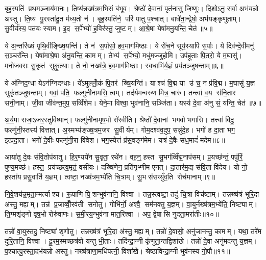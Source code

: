 बृह॒स्पति॑ प्रथ॒मञ्जाय॑मानः। ति॒ष्य॑न्नख्ष॑त्रम॒भिसं ब॑भूव। श्रेष्ठो॑ दे॒वानां॒ पृत॑नासु जि॒ष्णुः। दिशोऽनु॒ सर्वा॒ अभ॑यन्नो अस्तु। ति॒ष्य॑ पु॒रस्ता॑दु॒त म॑ध्य॒तो न॑। बृह॒स्पति॑र्न॒ परि॑ पातु प॒श्चात्। बाधे॑ता॒न्द्वेषो॒ अभ॑यङ्कृणुताम्। सु॒वीर्य॑स्य॒ पत॑यः स्याम। इ॒द स॒र्पेभ्यो॑ ह॒विर॑स्तु॒ जुष्टम्। आ॒श्रे॒षा येषा॑मनु॒यन्ति॒ चेत॑॥५॥

ये अ॒न्तरि॑ख्षं पृथि॒वीङ्ख्षि॒यन्ति॑। ते न॑ स॒र्पासो॒ हव॒माग॑मिष्ठाः। ये रो॑च॒ने सूर्य॒स्यापि॑ स॒र्पाः। ये दिव॑न्दे॒वीमनु॑ स॒ञ्चर॑न्ति। येषा॑माश्रे॒षा अ॑नु॒यन्ति॒ कामम्। तेभ्य॑ स॒र्पेभ्यो॒ मधु॑मज्जुहोमि। उप॑हूताः पि॒तरो॒ ये म॒घासु॑। मनो॑जवसः सु॒कृत॑ सुकृ॒त्याः। ते नो॒ नख्ष॑त्रे॒ हव॒माग॑मिष्ठाः। स्व॒धाभि॑र्य॒ज्ञं प्रय॑तञ्जुषन्ताम्॥६॥

ये अ॑ग्निद॒ग्धा येऽन॑ग्निदग्धाः। ये॑ऽमुल्लोँ॒कं पि॒तर॑ ख्षि॒यन्ति॑। याश्च॑ वि॒द्म या उ॑ च॒ न प्र॑वि॒द्म। म॒घासु॑ य॒ज्ञ सुकृ॑तञ्जुषन्ताम्। गवां॒ पति॒ फल्गु॑नीनामसि॒ त्वम्। तद॑र्यमन्वरुण मित्र॒ चारु॑। तन्त्वा॑ व॒य स॑नि॒तार सनी॒नाम्। जी॒वा जीव॑न्त॒मुप॒ सव्विँ॑शेम। येने॒मा विश्वा॒ भुव॑नानि॒ सञ्जि॑ता। यस्य॑ दे॒वा अ॑नु सं॒ यन्ति॒ चेत॑॥७॥

अ॒र्य॒मा राजा॒ऽजर॒स्तुवि॑ष्मान्। फल्गु॑नीनामृष॒भो रो॑रवीति। श्रेष्ठो॑ दे॒वानां भगवो भगासि। तत्त्वा॑ विदु॒ फल्गु॑नी॒स्तस्य॑ वित्तात्। अ॒स्मभ्य॑ङ्ख्ष॒त्रम॒जर सु॒वीर्यम्। गोम॒दश्व॑व॒दुप॒ सन्नु॑दे॒ह। भगो॑ ह दा॒ता भग॒ इत्प्र॑दा॒ता। भगो॑ दे॒वीः फल्गु॑नी॒रा वि॑वेश। भग॒स्येत्तं प्र॑स॒वङ्ग॑मेम। यत्र॑ दे॒वैः स॑ध॒मादं॑ मदेम॥८॥

आया॑तु दे॒वः स॑वि॒तोप॑यातु। हि॒र॒ण्यये॑न सु॒वृता॒ रथे॑न। वह॒न्॒ हस्त सु॒भग॑व्विँद्म॒नाप॑सम्। प्र॒यच्छ॑न्तं॒ पपु॑रिं॒ पुण्य॒मच्छ॑। हस्त॒ प्रय॑च्छत्व॒मृतं॒ वसी॑यः। दख्षि॑णेन॒ प्रति॑गृभ्णीम एनत्। दा॒तार॑म॒द्य स॑वि॒ता वि॑देय। यो नो॒ हस्ता॑य प्रसु॒वाति॑ य॒ज्ञम्। त्वष्टा॒ नख्ष॑त्रम॒भ्ये॑ति चि॒त्राम्। सु॒भस॑सय्युँव॒ति रोच॑मानाम्॥९॥

नि॒वे॒शय॑न्न॒मृता॒न्मर्त्याश्च। रू॒पाणि॑ पि॒शन्भुव॑नानि॒ विश्वा। तन्न॒स्त्वष्टा॒ तदु॑ चि॒त्रा विच॑ष्टाम्। तन्नख्ष॑त्रं भूरि॒दा अ॑स्तु॒ मह्यम्। तन्न॑ प्र॒जाव्वीँ॒रव॑ती सनोतु। गोभि॑र्नो॒ अश्वै॒ सम॑नक्तु य॒ज्ञम्। वा॒युर्नख्ष॑त्रम॒भ्ये॑ति॒ निष्ट्याम्। ति॒ग्मशृ॑ङ्गो वृष॒भो रोरु॑वाणः। स॒मी॒रय॒न्भुव॑ना मात॒रिश्वा। अप॒ द्वेषासि नुदता॒मरा॑तीः॥१०॥

तन्नो॑ वा॒युस्तदु॒ निष्ट्या॑ शृणोतु। तन्नख्ष॑त्रं भूरि॒दा अ॑स्तु॒ मह्यम्। तन्नो॑ दे॒वासो॒ अनु॑जानन्तु॒ कामम्। यथा॒ तरे॑म दुरि॒तानि॒ विश्वा। दू॒रम॒स्मच्छत्र॑वो यन्तु भी॒ताः। तदि॑न्द्रा॒ग्नी कृ॑णुता॒न्तद्विशा॑खे। तन्नो॑ दे॒वा अनु॑मदन्तु य॒ज्ञम्। प॒श्चात्पु॒रस्ता॒दभ॑यन्नो अस्तु। नख्ष॑त्राणा॒मधि॑पत्नी॒ विशा॑खे। श्रेष्ठा॑विन्द्रा॒ग्नी भुव॑नस्य गो॒पौ॥११॥

